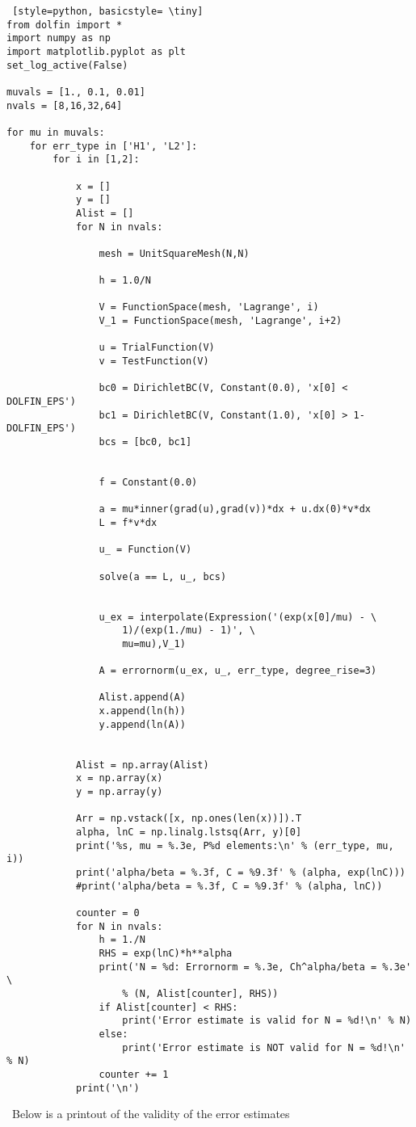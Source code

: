 \documentclass[a4paper,english,12pt,twoside]{article}
\begin{document}
\begin{lstlisting} [style=python, basicstyle= \tiny]
from dolfin import *
import numpy as np
import matplotlib.pyplot as plt
set_log_active(False)

muvals = [1., 0.1, 0.01]
nvals = [8,16,32,64]

for mu in muvals:
	for err_type in ['H1', 'L2']:
		for i in [1,2]:
		
			x = []
			y = []
			Alist = []
			for N in nvals:

				mesh = UnitSquareMesh(N,N)

				h = 1.0/N

				V = FunctionSpace(mesh, 'Lagrange', i)
				V_1 = FunctionSpace(mesh, 'Lagrange', i+2)

				u = TrialFunction(V)
				v = TestFunction(V)

				bc0 = DirichletBC(V, Constant(0.0), 'x[0] < DOLFIN_EPS')
				bc1 = DirichletBC(V, Constant(1.0), 'x[0] > 1-DOLFIN_EPS')
				bcs = [bc0, bc1]


				f = Constant(0.0)

				a = mu*inner(grad(u),grad(v))*dx + u.dx(0)*v*dx
				L = f*v*dx

				u_ = Function(V)

				solve(a == L, u_, bcs)

				
				u_ex = interpolate(Expression('(exp(x[0]/mu) - \
					1)/(exp(1./mu) - 1)', \
					mu=mu),V_1)

				A = errornorm(u_ex, u_, err_type, degree_rise=3)

				Alist.append(A)
				x.append(ln(h))
				y.append(ln(A))


			Alist = np.array(Alist)
			x = np.array(x)
			y = np.array(y)

			Arr = np.vstack([x, np.ones(len(x))]).T
			alpha, lnC = np.linalg.lstsq(Arr, y)[0]
			print('%s, mu = %.3e, P%d elements:\n' % (err_type, mu, i))
			print('alpha/beta = %.3f, C = %9.3f' % (alpha, exp(lnC)))
			#print('alpha/beta = %.3f, C = %9.3f' % (alpha, lnC))

			counter = 0
			for N in nvals:
				h = 1./N
				RHS = exp(lnC)*h**alpha
				print('N = %d: Errornorm = %.3e, Ch^alpha/beta = %.3e' \
					% (N, Alist[counter], RHS))
				if Alist[counter] < RHS:
					print('Error estimate is valid for N = %d!\n' % N)
				else:
					print('Error estimate is NOT valid for N = %d!\n' % N)
				counter += 1
			print('\n')
\end{lstlisting}
\
Below is a printout of the validity of the error estimates
\end{document}
